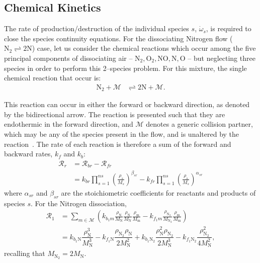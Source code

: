 \documentclass[10pt]{article}
\begin{document}
\subsection{Chemical Kinetics}
The rate of production/destruction of the individual species $s$, $\dot{\omega}_s$, is required to close the species continuity equations. For the dissociating Nitrogen flow ($  \text{N}_2 \rightleftharpoons 2 \text{N}$) case, let us consider the chemical reactions which occur among the five principal components of dissociating air -- $\text{N}_2,\text{O}_2,\text{NO},\text{N},\text{O}$ -- but neglecting three species in order to perform this 2--species problem. For this mixture, the single chemical reaction that occur is:
\begin{align*}
 \text{N}_2 + \mathcal{M} &\rightleftharpoons 2\text{N} + \mathcal{M} .
\end{align*}

This reaction can occur in either the forward or backward direction, as denoted by the bidirectional arrow. The reaction is presented such that they are endothermic in the forward direction, and $\mathcal{M}$ denotes a generic collision partner, which may be any of the species present in the flow, and  is unaltered by the reaction~\citep{Kirk2009}.
The rate of each reaction is therefore a sum of the forward and backward rates,  $k_{f}$ and $k_{b}$:
\begin{equation*}
 \begin{split}
\mathcal{R}_r &=  \mathcal{R}_{br} - \mathcal{R}_{fr} \\
                &= k_{br} \prod_{s=1}^{ns} \left(\frac{\rho_s}{M_s}\right)^{\beta_{sr}} - k_{fr} \prod_{s=1}^{ns} \left(\frac{\rho_s}{M_s}\right)^{\alpha_{sr}}
 \end{split}
\end{equation*}
where $\alpha_{sr}$ and $\beta_{sr}$ are the stoichiometric coefficients for reactants and products of species $s$.
For the Nitrogen dissociation,
\begin{equation}
\begin{split}             	                
\label{eq:reaction1}
 \mathcal{R}_1 &= \sum_{m\in\mathcal{M}}\left(k_{b_1 m} \frac{\rho_{\text{N}}}{M_{\text{N}}}\frac{\rho_{\text{N}}}{M_{\text{N}}}\frac{\rho_{\text{m}}}{M_{\text{m}}} - k_{f_1 m}\frac{\rho_{\text{N}_2}}{M_{\text{N}_2}}\frac{\rho_{\text{m}}}{M_{\text{m}}} \right) \\
%
&= k_{b_1 \text{N}} \dfrac{\rho_{\text{N}}^3}{M_\text{N}^3} -
k_{f_1 \text{N}}   \dfrac{\rho_{\text{N}_2} \rho_{\text{N}}}{2  M_\text{N}^2}+
k_{b_1 \text{N}_2} \dfrac{\rho_\text{N}^2 \rho_{\text{N}_2}}{2M_\text{N}^3 }-
k_{f_1 \text{N}_2} \dfrac{\rho_{\text{N}_2}^2}{4 M_\text{N}^2},
\end{split}
\end{equation}
recalling that $M_{\text{N}_2}=2 M_\text{N}.$
\end{document}

